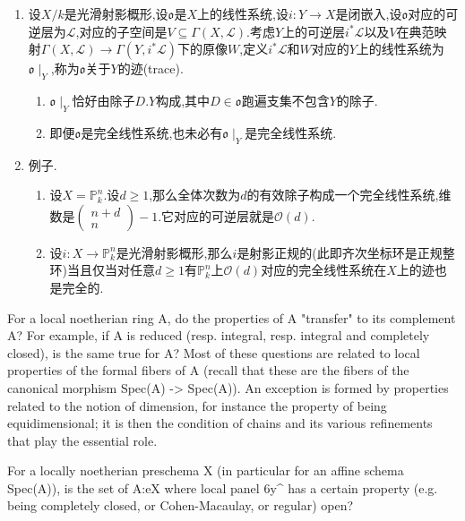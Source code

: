 \begin{enumerate}
\begin{enumerate}[(1)]
\begin{itemize}
		\end{itemize}
	\end{enumerate}
	\item 设$X/k$是光滑射影概形,设$\mathfrak{o}$是$X$上的线性系统,设$i:Y\to X$是闭嵌入,设$\mathfrak{o}$对应的可逆层为$\mathscr{L}$,对应的子空间是$V\subseteq\Gamma(X,\mathscr{L})$.考虑$Y$上的可逆层$i^*\mathscr{L}$以及$V$在典范映射$\Gamma(X,\mathscr{L})\to\Gamma(Y,i^*\mathscr{L})$下的原像$W$,定义$i^*\mathscr{L}$和$W$对应的$Y$上的线性系统为$\mathfrak{o}\mid_Y$,称为$\mathfrak{o}$关于$Y$的迹(trace).
	\begin{enumerate}[(1)]
		\item $\mathfrak{o}\mid_Y$恰好由除子$D.Y$构成,其中$D\in\mathfrak{o}$跑遍支集不包含$Y$的除子.
		\item 即便$\mathfrak{o}$是完全线性系统,也未必有$\mathfrak{o}\mid_Y$是完全线性系统.
	\end{enumerate}
	\item 例子.
	\begin{enumerate}[(1)]
		\item 设$X=\mathbb{P}_k^n$.设$d\ge1$,那么全体次数为$d$的有效除子构成一个完全线性系统,维数是$\left(\begin{array}{c}n+d\\n\end{array}\right)-1$.它对应的可逆层就是$\mathscr{O}(d)$.
		\item 设$i:X\to\mathbb{P}_k^n$是光滑射影概形,那么$i$是射影正规的(此即齐次坐标环是正规整环)当且仅当对任意$d\ge1$有$\mathbb{P}_k^n$上$\mathscr{O}(d)$对应的完全线性系统在$X$上的迹也是完全的.
	\end{enumerate}
\end{enumerate}

For a local noetherian ring A, do the properties of A "transfer" to its complement A? For example, if A is reduced (resp. integral, resp. integral and completely closed), is the same true for A? Most of these questions are related to local properties of the formal fibers of A (recall that these are the fibers of the canonical morphism Spec(A) -> Spec(A)). An exception is formed by properties related to the notion of dimension, for instance the property of being equidimensional; it is then the condition of chains and its various refinements that play the essential role.

For a locally noetherian preschema X (in particular for an affine schema Spec(A)), is the set of A:eX where local panel 6y^ has a certain property (e.g. being completely closed, or Cohen-Macaulay, or regular) open?


